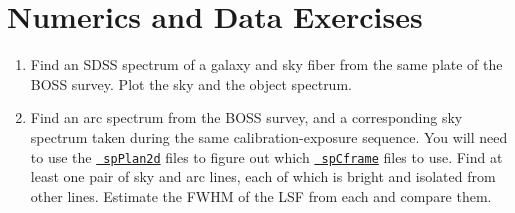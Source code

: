 

\section{Numerics and Data Exercises}

\begin{enumerate}
\item Find an SDSS spectrum of a galaxy and sky fiber from the same
    plate of the BOSS survey. Plot the sky and the object spectrum.
\item Find an arc spectrum from the BOSS survey, and a corresponding sky
spectrum taken during the same calibration-exposure sequence. You will
need to use
the \href{https://data.sdss.org/datamodel/files/SPECTRO_REDUX/RUN2D/PLATE4/spPlan2d.html}{\tt
spPlan2d} files to figure out which
\href{https://data.sdss.org/datamodel/files/BOSS_SPECTRO_REDUX/RUN2D/PLATE4/spCFrame.html}{\tt
spCframe} files to use. Find at least one pair of sky and arc lines,
each of which is bright and isolated from other lines. Estimate the
FWHM of the LSF from each and compare them.
\end{enumerate}


  
